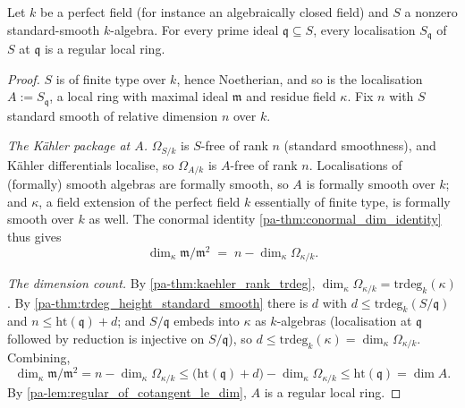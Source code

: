\begin{theorem}
  \label{pa-thm:smooth_prime_regularity}
  \leanok

  Let \(k\) be a perfect field (for instance an algebraically closed field) and \(S\) a
  nonzero standard-smooth \(k\)-algebra. For every prime ideal
  \(\mathfrak q \subseteq S\), every localisation \(S_{\mathfrak q}\) of \(S\) at
  \(\mathfrak q\) is a regular local ring.
\end{theorem}
\begin{proof}
  \leanok
  \(S\) is of finite type over \(k\), hence Noetherian, and so is the localisation
  \(A := S_{\mathfrak q}\), a local ring with maximal ideal \(\mathfrak m\) and residue
  field \(\kappa\). Fix \(n\) with \(S\) standard smooth of relative dimension \(n\)
  over \(k\).

  \emph{The K\"ahler package at \(A\).} \(\Omega_{S/k}\) is \(S\)-free of rank \(n\)
  (standard smoothness), and K\"ahler differentials localise, so \(\Omega_{A/k}\) is
  \(A\)-free of rank \(n\). Localisations of (formally) smooth algebras are formally
  smooth, so \(A\) is formally smooth over \(k\); and \(\kappa\), a field extension of
  the perfect field \(k\) essentially of finite type, is formally smooth over \(k\) as
  well. The conormal identity \ref{pa-thm:conormal_dim_identity} thus gives
  \[
    \dim_\kappa \mathfrak m/\mathfrak m^2 \;=\; n - \dim_\kappa \Omega_{\kappa/k}.
  \]

  \emph{The dimension count.} By \ref{pa-thm:kaehler_rank_trdeg},
  \(\dim_\kappa \Omega_{\kappa/k} = \mathrm{trdeg}_k(\kappa)\). By
  \ref{pa-thm:trdeg_height_standard_smooth} there is \(d\) with
  \(d \leq \mathrm{trdeg}_k(S/\mathfrak q)\) and
  \(n \leq \mathrm{ht}(\mathfrak q) + d\); and \(S/\mathfrak q\) embeds into \(\kappa\)
  as \(k\)-algebras (localisation at \(\mathfrak q\) followed by reduction is injective
  on \(S/\mathfrak q\)), so
  \(d \leq \mathrm{trdeg}_k(\kappa) = \dim_\kappa \Omega_{\kappa/k}\). Combining,
  \[
    \dim_\kappa \mathfrak m/\mathfrak m^2
      = n - \dim_\kappa \Omega_{\kappa/k}
      \leq \bigl(\mathrm{ht}(\mathfrak q) + d\bigr) - \dim_\kappa \Omega_{\kappa/k}
      \leq \mathrm{ht}(\mathfrak q) = \dim A.
  \]
  By \ref{pa-lem:regular_of_cotangent_le_dim}, \(A\) is a regular local ring.
\end{proof}
